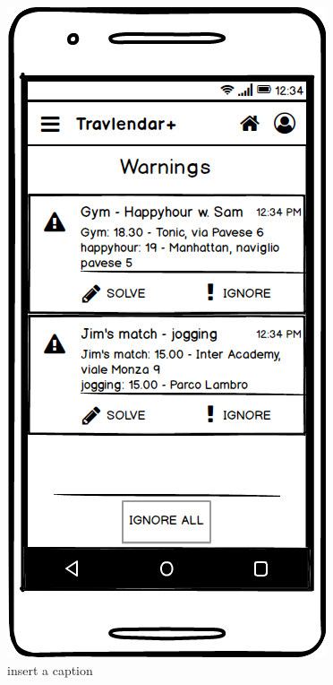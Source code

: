 \documentclass[11pt]{article}
\begin{document}
	\begin{figure}
		\centering
		\includegraphics[width=0.7\linewidth]{Warnings.png}
		\caption{insert a caption}
		\label{fig:warnings}
	\end{figure}
\end{document}
